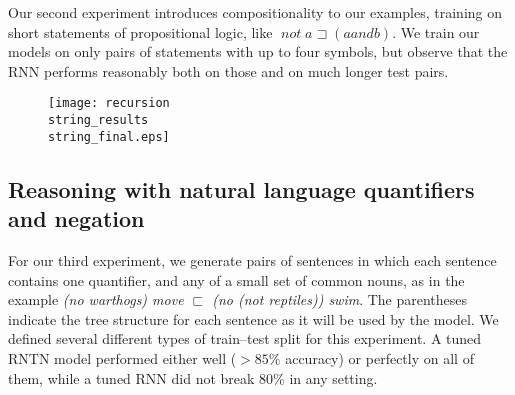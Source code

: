 \documentclass{article} %
\newcommand{\natfor}{\sqsubset}
\newcommand{\natrev}{\sqsupset}
\newcommand{\plneg}{\mathop{\textit{not}}}
\newcommand{\pland}{\mathbin{\textit{and}}}
\begin{document}
Our second experiment introduces compositionality to our examples, training on short statements of propositional logic, like $\plneg a\natrev(a \pland b)$. We train our models on only pairs of statements with up to four symbols, but observe that the RNN performs reasonably both on those and on much longer test pairs. 

\begin{figure}[h]
  \centering
  \texttt{[image: recursion\\string\_results\\string\_final.eps]}
  \label{prop-results}
\end{figure}

\subsection*{Reasoning with natural language quantifiers and negation}\label{sec:quantifiers}

For our third experiment, we generate pairs of sentences in which each sentence contains one quantifier, and any of a small set of common nouns, as in the example \textit{(no warthogs) move $\natfor$ (no (not reptiles)) swim}. The parentheses indicate the tree structure for each sentence as it will be used by the model. We defined several different types of train--test split for this experiment. A tuned RNTN model performed either well ($>85\%$ accuracy) or perfectly on all of them, while a tuned RNN did not break 80\% in any setting.




\small %
 
\end{document}
